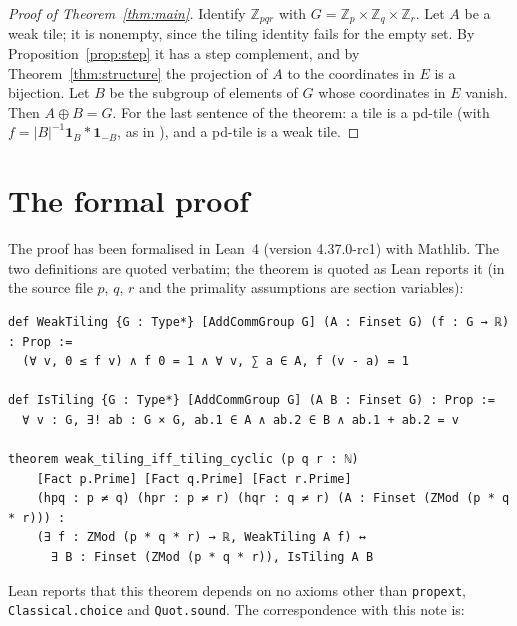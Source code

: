 \documentclass[11pt,a4paper]{amsart}
\theoremstyle{definition}
\theoremstyle{remark}
\newcommand{\Z}{\mathbb{Z}}
\newcommand{\one}{\mathbf{1}}
\begin{document}
\begin{proof}[Proof of Theorem~\ref{thm:main}]
Identify $\Z_{pqr}$ with $G=\Z_p\times\Z_q\times\Z_r$. Let $A$ be a weak tile; it is nonempty, since the
tiling identity fails for the empty set. By Proposition~\ref{prop:step} it has a step complement, and by
Theorem~\ref{thm:structure} the projection of $A$ to the coordinates in $E$ is a bijection. Let $B$ be the
subgroup of elements of $G$ whose coordinates in $E$ vanish. Then $A\oplus B=G$. For the last sentence of the
theorem: a tile is a pd-tile (with $f=|B|^{-1}\one_B*\one_{-B}$, as in \cite{KMMS,KLMS}), and a pd-tile is a weak
tile.
\end{proof}

\section{The formal proof}\label{sec:lean}

The proof has been formalised in Lean~4 (version 4.37.0-rc1) with Mathlib. The two definitions are quoted
verbatim; the theorem is quoted as Lean reports it (in the source file $p$, $q$, $r$ and the primality
assumptions are section variables):
{\small
\begin{verbatim}
def WeakTiling {G : Type*} [AddCommGroup G] (A : Finset G) (f : G → ℝ) : Prop :=
  (∀ v, 0 ≤ f v) ∧ f 0 = 1 ∧ ∀ v, ∑ a ∈ A, f (v - a) = 1

def IsTiling {G : Type*} [AddCommGroup G] (A B : Finset G) : Prop :=
  ∀ v : G, ∃! ab : G × G, ab.1 ∈ A ∧ ab.2 ∈ B ∧ ab.1 + ab.2 = v

theorem weak_tiling_iff_tiling_cyclic (p q r : ℕ)
    [Fact p.Prime] [Fact q.Prime] [Fact r.Prime]
    (hpq : p ≠ q) (hpr : p ≠ r) (hqr : q ≠ r) (A : Finset (ZMod (p * q * r))) :
    (∃ f : ZMod (p * q * r) → ℝ, WeakTiling A f) ↔
      ∃ B : Finset (ZMod (p * q * r)), IsTiling A B
\end{verbatim}}
\noindent Lean reports that this theorem depends on no axioms other than \texttt{propext},
\texttt{Classical.choice} and \texttt{Quot.sound}. The correspondence with this note is:
\end{document}
